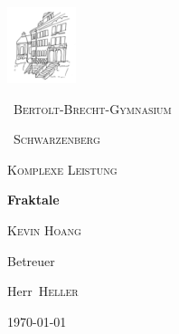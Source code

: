 \documentclass[12pt,a4paper]{report}
\begin{document}
\begin{titlepage}
	\centering
	\includegraphics[width=0.15\textwidth]{logo.png}\par\vspace{1cm}
	{\scshape\ Bertolt-Brecht-Gymnasium \par}
	{\scshape\ Schwarzenberg \par}
	\vspace{1cm}
	{\scshape\Large Komplexe Leistung\par}
	\vspace{1.5cm}
	{\huge\bfseries Fraktale\par}
	\vspace{2cm}
	{\Large\textsc{Kevin Hoang}\par}
	\vfill
	Betreuer \par
	Herr~\textsc{Heller} \vfill
	{\large \today\par}
\end{titlepage}

\tableofcontents






\end{document}
